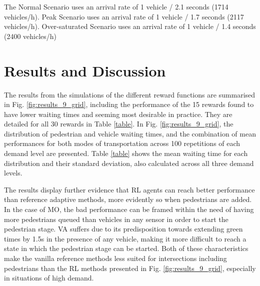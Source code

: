 \documentclass[a4paper, conference]{IEEEtran}
\begin{document}
The Normal Scenario uses an arrival rate of 1 vehicle / 2.1 seconds (1714 vehicles/h). Peak Scenario uses an arrival rate of 1 vehicle / 1.7 seconds (2117 vehicles/h). Over-saturated Scenario uses an arrival rate of 1 vehicle / 1.4 seconds (2400 vehicles/h)


\section{Results and Discussion}
\label{results}
The results from the simulations of the different reward functions are summarised in Fig. \ref{fig:results_9_grid}, including the performance of the 15 rewards found to have lower waiting times and seeming most desirable in practice. They are detailed for all 30 rewards in Table \ref{table}.
In Fig. \ref{fig:results_9_grid}, the distribution of pedestrian and vehicle waiting times, and the combination of mean performances for both modes of transportation across 100 repetitions of each demand level are presented.
Table \ref{table} shows the mean waiting time for each distribution and their standard deviation, also calculated across all three demand levels. 

The results display further evidence that RL agents can reach better performance than reference adaptive methods, more evidently so when pedestrians are added.
In the case of MO, the bad performance can be framed within the need of having more pedestrians queued than vehicles in any sensor in order to start the pedestrian stage.
VA suffers due to its predisposition towards extending green times by 1.5s in the presence of any vehicle, making it more difficult to reach a state in which the pedestrian stage can be started.
Both of these characteristics make the vanilla reference methods less suited for intersections including pedestrians than the RL methods presented in Fig. \ref{fig:results_9_grid}, especially in situations of high demand.
\end{document}
